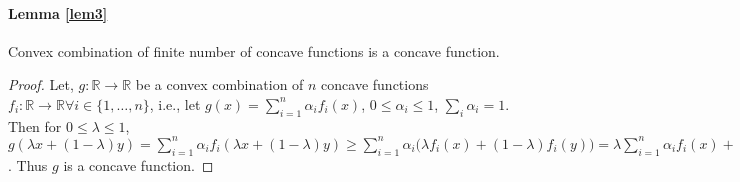 \documentclass{article}
\begin{document}
\paragraph{Lemma \ref{lem3}}
Convex combination of finite number of concave functions is a concave function. %
\begin{proof}
Let, $g:\mathbb{R}\rightarrow \mathbb{R}$ be a convex combination of $n$ concave functions $f_i:\mathbb{R}\rightarrow \mathbb{R} \forall i\in \{1,\dots,n\}$, i.e., let $g(x)=\sum_{i=1}^n\alpha_if_i(x)$, $0\leq \alpha_i \leq 1$, $\sum_i \alpha_i=1$. Then for $0\leq \lambda \leq 1$, $g(\lambda x+(1-\lambda)y)=\sum_{i=1}^n\alpha_if_i(\lambda x+(1-\lambda)y)\geq \sum_{i=1}^n\alpha_i\bigg(\lambda f_i(x)+(1-\lambda)f_i(y)\bigg)=\lambda \sum_{i=1}^n\alpha_if_i(x)+(1-\lambda)\sum_{i=1}^n\alpha_if_i(y)=\lambda g(x)+(1-\lambda)g(y)$. Thus $g$ is a concave function.
\end{proof}
\end{document}
